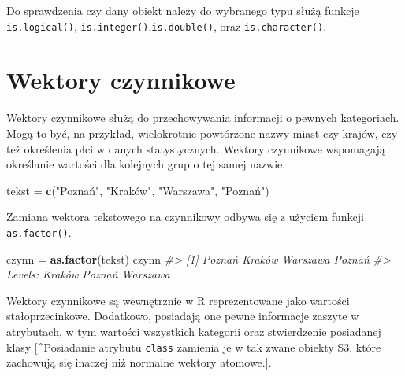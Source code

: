 \documentclass[paper=6in:9in,pagesize=pdftex,headinclude=on,footinclude=on,10pt]{scrbook}
\newenvironment{Shaded}{\begin{snugshade}}{\end{snugshade}}
\newcommand{\CommentTok}[1]{\textcolor[rgb]{0.56,0.35,0.01}{\textit{#1}}}
\newcommand{\KeywordTok}[1]{\textcolor[rgb]{0.13,0.29,0.53}{\textbf{#1}}}
\newcommand{\NormalTok}[1]{#1}
\newcommand{\StringTok}[1]{\textcolor[rgb]{0.31,0.60,0.02}{#1}}
\begin{document}
Do sprawdzenia czy dany obiekt należy do wybranego typu służą funkcje \texttt{is.logical()}, \texttt{is.integer()},\texttt{is.double()}, oraz \texttt{is.character()}.

\hypertarget{fac}{%
\section{Wektory czynnikowe}\label{fac}}

Wektory czynnikowe służą do przechowywania informacji o pewnych kategoriach.
Mogą to być, na przykład, wielokrotnie powtórzone nazwy miast czy krajów, czy też określenia płci w danych statystycznych.
Wektory czynnikowe wspomagają określanie wartości dla kolejnych grup o tej samej nazwie.

\begin{Shaded}
\begin{Highlighting}[]
\NormalTok{tekst =}\StringTok{ }\KeywordTok{c}\NormalTok{(}\StringTok{"Poznań"}\NormalTok{, }\StringTok{"Kraków", "}\NormalTok{Warszawa}\StringTok{", "}\NormalTok{Poznań}\StringTok{")}
\end{Highlighting}
\end{Shaded}

Zamiana wektora tekstowego na czynnikowy odbywa się z użyciem funkcji \texttt{as.factor()}.

\begin{Shaded}
\begin{Highlighting}[]
\NormalTok{czynn =}\StringTok{ }\KeywordTok{as.factor}\NormalTok{(tekst)}
\NormalTok{czynn}
\CommentTok{#> [1] Poznań   Kraków   Warszawa Poznań  }
\CommentTok{#> Levels: Kraków Poznań Warszawa}
\end{Highlighting}
\end{Shaded}

Wektory czynnikowe są wewnętrznie w R reprezentowane jako wartości stałoprzecinkowe.
Dodatkowo, posiadają one pewne informacje zaszyte w atrybutach, w tym wartości wszystkich kategorii oraz stwierdzenie posiadanej klasy {[}\^{}Posiadanie atrybutu \texttt{class} zamienia je w tak zwane obiekty S3, które zachowują się inaczej niż normalne wektory atomowe.{]}.

\begin{Shaded}
\end{Shaded}
\end{document}
